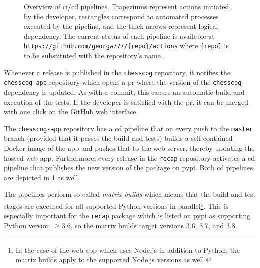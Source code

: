 \documentclass[../report.tex]{subfiles}
\begin{document}
\begin{figure}
{
    }
    \caption[Overview of \acs{ci}/\acs{cd} pipelines.]{Overview of \acs{ci}/\acs{cd} pipelines. Trapeziums represent actions initiated by the developer, rectangles correspond to automated processes executed by the pipeline, and the thick arrows represent logical dependency. The current status of each pipeline is available at \texttt{https://github.com/georgw777/\{repo\}/actions} where \texttt{\{repo\}} is to be substituted with the repository’s name.}
    \label{fig:cicd}
\end{figure}
Whenever a release is published in the \texttt{chesscog} repository, it notifies the \texttt{chesscog-app} repository which opens a \gls{pr} where the version of the \texttt{chesscog} dependency is updated.
As with a commit, this causes an automatic build and execution of the tests.
If the developer is satisfied with the \gls{pr}, it can be merged with one click on the GitHub web interface.

The \texttt{chesscog-app} repository has a \gls{cd} pipeline that on every push to the \texttt{master} branch (provided that it passes the build and tests) builds a self-contained Docker image of the app and pushes that to the web server, thereby updating the hosted web app.
Furthermore, every release in the \texttt{recap} repository activates a \gls{cd} pipeline that publishes the new version of the package on \gls{pypi}.
Both \gls{cd} pipelines are depicted in \cref{fig:cicd} as well.

The pipelines perform so-called \emph{matrix builds} which means that the build and test stages are executed for all supported Python versions in parallel\footnote{In the case of the web app which uses Node.js in addition to Python, the matrix builds apply to the supported Node.js versions as well.}.
This is especially important for the \texttt{recap} package which is listed on \gls{pypi} as supporting Python version $\geq 3.6$, so the matrix builds target versions 3.6, 3.7, and 3.8.
\end{document}
